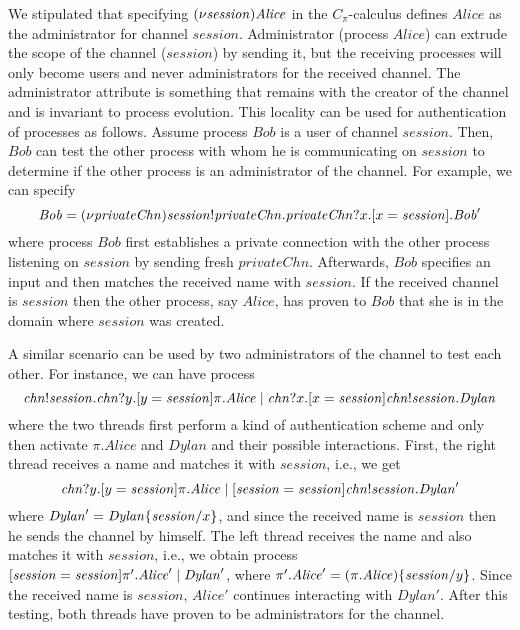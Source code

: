We stipulated that specifying $(\nu \mathit{session})\mathit{Alice}$ in the $C_\pi$-calculus defines $\mathit{
Alice}$ as the administrator for channel $\mathit{session}$. Administrator (process $\mathit{Alice}$) can extrude the scope of the channel ($\mathit{session}$) by sending it, but the receiving processes will only become users and never administrators for the received channel. 
The administrator attribute is something that remains with the creator of the channel and is invariant to process evolution. 
This locality can be used for authentication of processes as follows. 
Assume process $\mathit{Bob}$ is a user of channel $\mathit{session}$. Then, $\mathit{Bob}$ can test the other process with whom he is communicating on $\mathit{session}$ to determine if the other process is an administrator of the channel.
For example, we can specify
\[
\mathit{Bob}=(\nu \mathit{privateChn})\mathit{session}!\mathit{privateChn}.\mathit{privateChn}?x.[ x = \mathit{session} ].\mathit{Bob}'
\]
where process $\mathit{Bob}$ first establishes a private connection with the other process listening on $\mathit{session}$ by sending fresh $\mathit{privateChn}$. Afterwards, $\mathit{Bob}$ specifies an input and then matches the received name with $\mathit{session}$. If the received channel is $\mathit{session}$ then the other process, say $\mathit{Alice}$, has proven to $\mathit{Bob}$ that she is in the domain where $\mathit{session}$ was created.

A similar scenario can be used by two administrators of the channel to test each other. 
For instance, we can have process
%
\[
 \mathit{chn}!\mathit{session}.\mathit{chn}?y.[ y = \mathit{session} ]\pi.\mathit{Alice}
\;|\;
\mathit{chn}?x.[ x = \mathit{session} ]\mathit{chn}!\mathit{session}.\mathit{Dylan}
\]
%
where the two threads first perform a kind of authentication scheme and only then activate $\pi.\mathit{Alice}$ and $\mathit{Dylan}$ and their possible interactions.  
First, the right thread receives a name and matches it with $\mathit{session}$, i.e., we get 
\[
\mathit{chn}?y.[ y = \mathit{session} ]\pi.\mathit{Alice}
\;|\;
[ \mathit{session} = \mathit{session} ]\mathit{chn}!\mathit{session}.\mathit{Dylan}'
\]
where $\mathit{Dylan}'=\mathit{Dylan}\{\mathit{session}/x\}$, and since the received name is $\mathit{session}$ then he sends the channel by himself. 
The left thread receives the name and also matches it with $\mathit{session}$, i.e., we obtain process $[ \mathit{session} = \mathit{session} ]\pi'.\mathit{Alice}'
\;|\;
\mathit{Dylan}'$, where $\pi'.\mathit{Alice}'=(\pi.\mathit{Alice})\{\mathit{session}/y\}$. 
Since the received name is $\mathit{session}$, $\mathit{Alice}'$ continues interacting with $\mathit{Dylan}'$. After this testing, both threads have proven to be administrators for the channel.%






